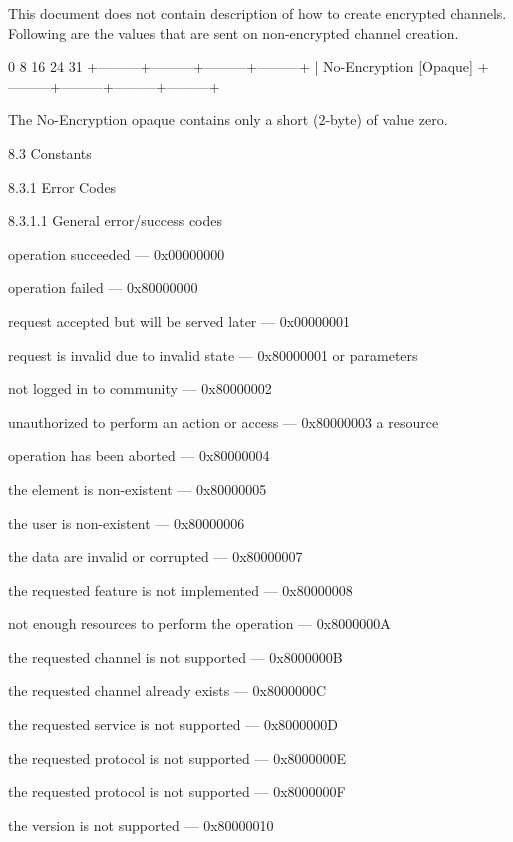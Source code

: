 \documentclass[titlepage,oneside]{book}
\begin{document}
This document does not contain description of how to create encrypted
channels. Following are the values that are sent on non-encrypted
channel creation.

0         8         16        24      31
+---------+---------+---------+---------+
| No-Encryption [Opaque]
+---------+---------+---------+---------+

The No-Encryption opaque contains only a short (2-byte) of value zero.

8.3 Constants

8.3.1 Error Codes


8.3.1.1 General error/success codes

operation succeeded                               --- 0x00000000

operation failed                                  --- 0x80000000

request accepted but will be served later         --- 0x00000001

request is invalid due to invalid state           --- 0x80000001
or parameters

not logged in to community                        --- 0x80000002

unauthorized to perform an action or access       --- 0x80000003
a resource

operation has been aborted                        --- 0x80000004

the element is non-existent                       --- 0x80000005

the user is non-existent                          --- 0x80000006

the data are invalid or corrupted                 --- 0x80000007

the requested feature is not implemented          --- 0x80000008

not enough resources to perform the operation     --- 0x8000000A

the requested channel is not supported            --- 0x8000000B

the requested channel already exists              --- 0x8000000C

the requested service is not supported            --- 0x8000000D

the requested protocol is not supported           --- 0x8000000E

the requested protocol is not supported           --- 0x8000000F

the version is not supported                      --- 0x80000010
\end{document}
